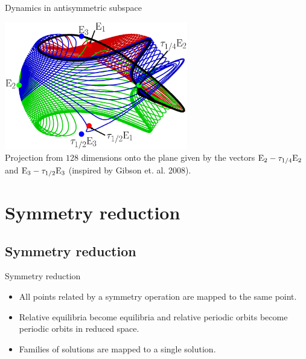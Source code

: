 \documentclass{beamer}
\begin{document}

\begin{frame}{Dynamics in antisymmetric subspace}
 \begin{centering}
         \includegraphics[width=0.6\textwidth]{../../figs/KS22hetero} \\
	Projection from $128$ dimensions onto the plane given by the vectors 
	$\mathrm{E}_{2}-\tau_{1/4}\mathrm{E}_{2}$ and $\mathrm{E}_{3}-\tau_{1/2}\mathrm{E}_{3}$ (inspired by Gibson et. al. 2008).
 \end{centering}
\end{frame}

\section[Symmetry reduction]{Symmetry reduction}

\subsection{Symmetry reduction}

\begin{frame}{Symmetry reduction}
\begin{itemize}
 \item All points related by a symmetry operation are mapped to the same point.
 \item Relative equilibria become equilibria and relative periodic orbits become periodic orbits in reduced space.
 \item Families of solutions are mapped to a single solution.
\end{itemize}
\end{frame}
\end{document}
